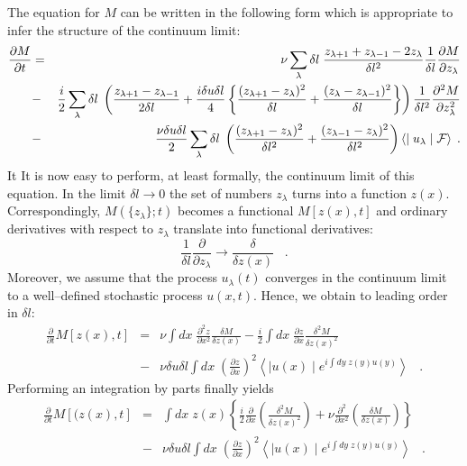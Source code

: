 The equation for $M$ can be written in
the following form which is appropriate
to infer the structure of the continuum limit:
\begin{eqnarray}
\frac{\partial M}{\partial t} &=& \nu \sum_{\lambda} \delta l \;
\frac{z_{\lambda +1} + z_{\lambda -1} -2z_{\lambda}}{\delta l^2}
\frac{1}{\delta l} \frac{\partial M}{\partial z_{\lambda}}
\nonumber\\
&-& \frac{i}{2} \sum_{\lambda} \delta l \;
\left( \frac{z_{\lambda +1} - z_{\lambda -1}}{2\delta l}
+ \frac{i\delta u \delta l}{4} \left\{
\frac{(z_{\lambda +1} - z_{\lambda})^2}{\delta l} +
\frac{(z_{\lambda} - z_{\lambda -1})^2}{\delta l} \right\} \right)
\frac{1}{\delta l^2} \frac{\partial^2 M}{\partial z_{\lambda}^2}
\nonumber\\
&-& \frac{\nu \delta u \delta l}{2} \sum_{\lambda} \delta l
\; \left(
\frac{(z_{\lambda +1} - z_{\lambda})^2}{\delta l^2} +
\frac{(z_{\lambda -1} - z_{\lambda})^2}{\delta l^2} \right)
\left\langle \mid u_{\lambda} \mid 
{\cal{F}} \right\rangle
\; .
\end{eqnarray}
It
It is now easy to perform, at least formally, the continuum limit
of this equation. In the limit $\delta l \longrightarrow 0$
the set of numbers $z_{\lambda}$ turns into a function $z(x)$.
Correspondingly, $M \left( \{z_{\lambda} \} ;t \right)$ becomes a
functional $M [z(x),t]$ and ordinary derivatives with respect
to $z_{\lambda}$ translate into functional derivatives:
\begin{equation}
\frac{1}{\delta l} \frac{\partial}{\partial z_{\lambda}}
\longrightarrow
\frac{\delta}{\delta z(x)} \;\;\; .
\end{equation}
Moreover, we assume that the process $u_{\lambda}(t)$
converges in the
continuum limit to a well--defined stochastic process $u(x,t)$.
Hence, we obtain to leading order in $\delta l$:
\begin{eqnarray}
\frac{\partial}{\partial t} M [z(x),t] &=&
\nu \int dx \; \frac{\partial^2 z}{\partial x^2}
\frac{\delta M}{\delta z(x)} - \frac{i}{2} \int dx \;
\frac{\partial z}{\partial x} \frac{\delta^2 M}{\delta z(x)^2}
\nonumber \\
&-& \nu \delta u \delta l \int dx \;
\left( \frac{\partial z}{\partial x} \right)^2 \left\langle
\mid u(x) \mid e^{i\int dy \; z(y) u(y)} \right\rangle     \;\;\; .
\end{eqnarray}
Performing an integration by parts finally yields
\begin{eqnarray}
\frac{\partial}{\partial t} M [(z(x),t] &=&  \int dx \; z(x) \left\{
\frac{i}{2} 
\frac{\partial}{\partial x} \left( \frac{\delta^2 M}{\delta z(x)^2}
 \right)
+ \nu \frac{\partial^2}{\partial x^2}
\left( \frac{\delta M}{\delta z(x)} \right) \right\}
\nonumber \\
&-& \nu \delta u \delta l \int dx \;
\left( \frac{\partial z}{\partial x} \right)^2 \left\langle
\mid u(x) \mid e^{i\int dy \; z(y) u(y)} \right\rangle     \;\;\; .
\label{HOPFMEQ}
\end{eqnarray}

